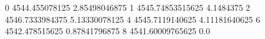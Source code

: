 0 4544.455078125 2.85498046875
1 4545.74853515625 4.1484375
2 4546.7333984375 5.13330078125
4 4545.7119140625 4.11181640625
6 4542.478515625 0.87841796875
8 4541.60009765625 0.0
